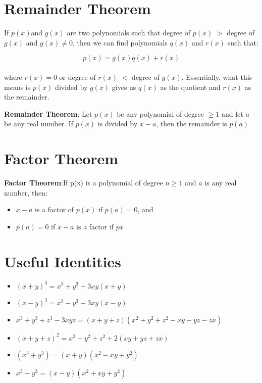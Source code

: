\documentclass{book}
\begin{document}
	\section{Remainder Theorem}
	If $p(x) $and $g(x)$ are two polynomials such that degree of $p(x)$ $>$ degree of $g(x)$ and $g(x) \neq 0$, then we can find polynomials $q(x)$ and $r(x)$ such that:
	
	$$p(x) = g(x)q(x) + r(x)$$ \\
	
where $r(x) =0$ or degree of $r(x)$ $<$ degree of $g(x)$. Essentially, what this means is $p(x)$ divided by $g(x)$ gives us $q(x)$ as the quotient and $r(x)$ as the remainder.
	\begin{mdframed}[backgroundcolor=yellow]
		\textbf{Remainder Theorem}:  Let $p(x)$ be any polynomial of degree $\ge 1$ and let $a$ be any real number. If $p(x)$ is divided by $x-a$, then the remainder is $p(a)$
	\end{mdframed}	

	\section{Factor Theorem}
	\begin{mdframed}[backgroundcolor=yellow]
		\textbf{Factor Theorem}:If p(x) is a polynomial of degree $n \ge 1$ and $a$ is any real number, then:
		\begin{itemize}
			\item $x-a$ is a factor of $p(x)$ if $p(a)=0$, and
			\item $p(a)=0$ if $x-a$ is a factor if $px$
		\end{itemize} 
	\end{mdframed}
	
	\section{Useful Identities}
	\begin{itemize}
		\item $(x+y)^3 = x^3 + y^3 + 3xy(x+y)$
		\item $(x-y)^3 = x^3 - y^3 -3xy(x-y)$
		\item $x^3 + y^3 + z^3 -3xyz = (x+y+z)(x^2 + y^2 + z^2 - xy -yz -zx)$
		\item $(x+y+z)^2 = x^2 + y^2 + z^2 + 2(xy + yz + zx)$
		\item $(x^3 + y^3)= (x+y)(x^2 -xy + y^2)$
		\item $x^3 - y^3 = (x-y)(x^2 + xy + y^2)$
	\end{itemize}
\end{document}

